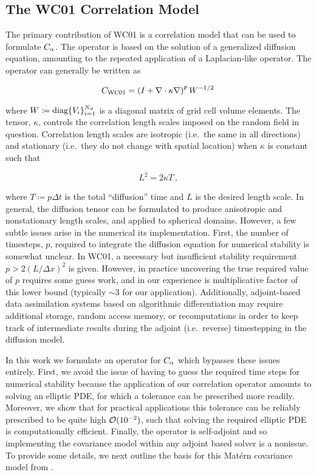 \subsection{The WC01 Correlation Model}
\label{ssec:wc01_review}


The primary contribution of WC01 is a correlation model that can be used to
formulate $C_\alpha$.
The operator is based on the solution of a generalized diffusion equation,
amounting to the repeated application of a Laplacian-like operator.
The operator can generally be written as
\begin{linenomath}\begin{equation}
    C_\text{WC01} = \left(
    I + \nabla\cdot\kappa\nabla \right)^p W^{-1/2} \,
\end{equation}\end{linenomath}
where $W \coloneqq \text{diag}\{V_i\}_{i=1}^{N_{\vartheta}}$ is a diagonal matrix of
grid cell volume elements.
The tensor, $\kappa$, controls the correlation length scales imposed on the
random field in question.
Correlation length scales are isotropic (i.e.\ the same in all directions) and
stationary (i.e.\ they do not change with spatial location) when $\kappa$ is
constant such that
\begin{linenomath}\begin{equation}
    L^2 = 2\kappa T \, ,
\end{equation}\end{linenomath}
where $T\coloneqq p \Delta t$ is the total ``diffusion'' time and $L$ is the
desired length scale.
In general, the diffusion tensor can be formulated to produce anisotropic and
nonstationary length scales, and applied to spherical domains.
However, a few subtle issues arise in the numerical its implementation.
First, the number of timesteps, $p$, required to integrate the diffusion
equation for numerical stability is somewhat unclear.
In WC01, a necessary but insufficient stability requirement
$p > 2 (L/\Delta x)^2$ is given.
However, in practice uncovering the true required value of $p$ requires some
guess work, and in our experience is multiplicative factor of this lower bound
(typically $\sim 3$ for our application).
Additionally, adjoint-based data assimilation systems based on algorithmic
differentiation may require additional storage, random access memory, or recomputations in order
to keep track of intermediate results during the adjoint (i.e.\ reverse) timestepping
in the diffusion model.

In this work we formulate an operator for $C_\alpha$ which bypasses these
issues entirely.
First, we avoid the issue of having to guess the required time steps for numerical
stability because the application of our correlation operator amounts to solving an
elliptic PDE, for which a tolerance can be prescribed more readily.
Moreover, we show that for practical applications this tolerance can be reliably
prescribed to be quite high $\mathcal{O}(10^{-2})$, such that solving the required
elliptic PDE is computationally efficient.
Finally, the operator is self-adjoint and so implementing the covariance model
within any adjoint based solver is a nonissue.
To provide some details, we next outline the basis for this Mat\'ern covariance
model from \citet{RSSB:RSSB777}.


